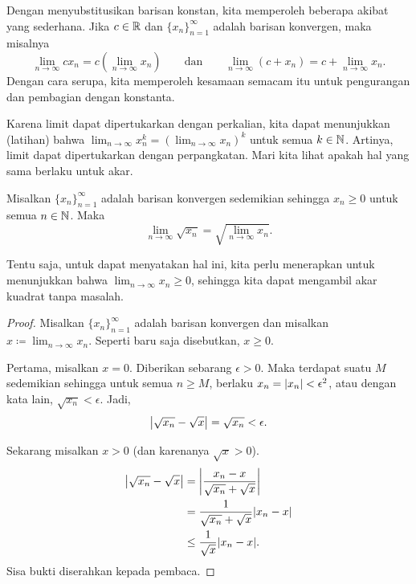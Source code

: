Dengan menyubstitusikan barisan konstan, kita memperoleh beberapa akibat yang sederhana.
Jika $c \in {\mathbb{R}}$ dan $\{ x_n \}_{n=1}^\infty$ adalah barisan konvergen, maka
misalnya
\begin{equation*}
\lim_{n \to \infty} c x_n = 
c \left( \lim_{n \to \infty} x_n \right) \qquad
\text{dan}
\qquad
\lim_{n \to \infty} (c + x_n) = 
c + \lim_{n \to \infty} x_n .
\end{equation*}
Dengan cara serupa, kita memperoleh kesamaan semacam itu untuk pengurangan dan pembagian dengan konstanta.

Karena limit dapat dipertukarkan dengan perkalian, kita dapat menunjukkan (latihan)
bahwa $\lim_{n\to\infty} x_n^k = {(\lim_{n\to\infty} x_n)}^k$ untuk semua $k \in {\mathbb{N}}$.
Artinya, limit dapat dipertukarkan
dengan perpangkatan.  Mari kita lihat apakah hal yang sama berlaku untuk akar.

\begin{prop}
\pagebreak[2]
Misalkan $\{ x_n \}_{n=1}^\infty$ adalah barisan konvergen sedemikian
sehingga $x_n \geq 0$ untuk semua $n \in {\mathbb{N}}$.
Maka
\begin{equation*}
\lim_{n\to\infty} \sqrt{x_n} =
\sqrt{ \lim_{n\to\infty} x_n } .
\end{equation*}
\end{prop}

Tentu saja, untuk dapat menyatakan hal ini, kita perlu menerapkan
 untuk menunjukkan
bahwa
$\lim_{n\to\infty} x_n \geq 0$, sehingga kita dapat mengambil akar kuadrat tanpa
masalah.

\begin{proof}
Misalkan $\{ x_n \}_{n=1}^\infty$ adalah barisan konvergen dan misalkan $x \coloneqq
\lim_{n\to\infty} x_n$.
Seperti baru saja disebutkan, $x \geq 0$.

Pertama, misalkan $x=0$.  Diberikan sebarang $\epsilon > 0$.
Maka terdapat suatu $M$ sedemikian sehingga untuk semua $n \geq M$, berlaku
$x_n = \lvert {x_n} \rvert < \epsilon^2$, atau dengan kata lain, $\sqrt{x_n} < \epsilon$.
Jadi,
\begin{equation*}
\left\lvert {\sqrt{x_n} - \sqrt{x}} \right\rvert =
\sqrt{x_n} < \epsilon.
\end{equation*}

Sekarang misalkan $x > 0$ (dan karenanya $\sqrt{x} > 0$).
\begin{equation*}
\begin{split}
\left\lvert {\sqrt{x_n}-\sqrt{x}} \right\rvert &= 
\left\lvert {\frac{x_n-x}{\sqrt{x_n}+\sqrt{x}}} \right\rvert \\
&=
\frac{1}{\sqrt{x_n}+\sqrt{x}}
\lvert {x_n-x} \rvert \\
& \leq
\frac{1}{\sqrt{x}}
\lvert {x_n-x} \rvert .
\end{split}
\end{equation*}
Sisa bukti diserahkan kepada pembaca.
\end{proof}

